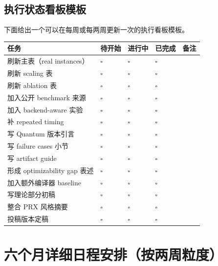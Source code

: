 \documentclass[11pt]{article}
\begin{document}
\begin{longtable}{p{} p{} p{} p{}}
\bottomrule
\end{longtable}

\subsection{执行状态看板模板}

下面给出一个可以在每周或每两周更新一次的执行看板模板。

\begin{longtable}{p{} p{} p{} p{} p{}}
\toprule
\textbf{任务} & \textbf{待开始} & \textbf{进行中} & \textbf{已完成} & \textbf{备注} \\
\midrule
\endhead

刷新主表（real instances） & $\square$ & $\square$ & $\square$ &  \\
刷新 scaling 表 & $\square$ & $\square$ & $\square$ &  \\
刷新 ablation 表 & $\square$ & $\square$ & $\square$ &  \\
加入公开 benchmark 来源 & $\square$ & $\square$ & $\square$ &  \\
加入 backend-aware 实验 & $\square$ & $\square$ & $\square$ &  \\
补 repeated timing & $\square$ & $\square$ & $\square$ &  \\
写 Quantum 版本引言 & $\square$ & $\square$ & $\square$ &  \\
写 failure cases 小节 & $\square$ & $\square$ & $\square$ &  \\
写 artifact guide & $\square$ & $\square$ & $\square$ &  \\
形成 optimizability gap 表述 & $\square$ & $\square$ & $\square$ &  \\
加入额外编译器 baseline & $\square$ & $\square$ & $\square$ &  \\
写理论部分初稿 & $\square$ & $\square$ & $\square$ &  \\
整合 PRX 风格摘要 & $\square$ & $\square$ & $\square$ &  \\
投稿版本定稿 & $\square$ & $\square$ & $\square$ &  \\

\bottomrule
\end{longtable}

\section{六个月详细日程安排（按两周粒度）}
\end{document}
